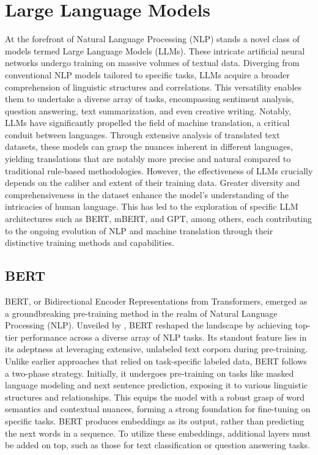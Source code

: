 \section{Large Language Models}
At the forefront of Natural Language Processing (NLP) stands a novel class of models termed Large Language Models (LLMs). 
These intricate artificial neural networks undergo training on massive volumes of textual data. Diverging from conventional NLP models tailored to specific tasks, LLMs acquire a broader comprehension of linguistic structures and correlations. 
This versatility enables them to undertake a diverse array of tasks, encompassing sentiment analysis, question answering, text summarization, and even creative writing. 
Notably, LLMs have significantly propelled the field of machine translation, a critical conduit between languages. 
Through extensive analysis of translated text datasets, these models can grasp the nuances inherent in different languages, yielding translations that are notably more precise and natural compared to traditional rule-based methodologies. 
However, the effectiveness of LLMs crucially depends on the caliber and extent of their training data. 
Greater diversity and comprehensiveness in the dataset enhance the model's understanding of the intricacies of human language. 
This has led to the exploration of specific LLM architectures such as BERT, mBERT, and GPT, among others, each contributing to the ongoing evolution of NLP and machine translation through their distinctive training methods and capabilities.

\subsection{BERT}
BERT, or Bidirectional Encoder Representations from Transformers, emerged as a groundbreaking pre-training method in the realm of Natural Language Processing (NLP). 
Unveiled by \cite{devlin18}, BERT reshaped the landscape by achieving top-tier performance across a diverse array of NLP tasks. 
Its standout feature lies in its adeptness at leveraging extensive, unlabeled text corpora during pre-training. 
Unlike earlier approaches that relied on task-specific labeled data, BERT follows a two-phase strategy. 
Initially, it undergoes pre-training on tasks like masked language modeling and next sentence prediction, exposing it to various linguistic structures and relationships. 
This equips the model with a robust grasp of word semantics and contextual nuances, forming a strong foundation for fine-tuning on specific tasks. 
BERT produces embeddings as its output, rather than predicting the next words in a sequence. 
To utilize these embeddings, additional layers must be added on top, such as those for text classification or question answering tasks.

